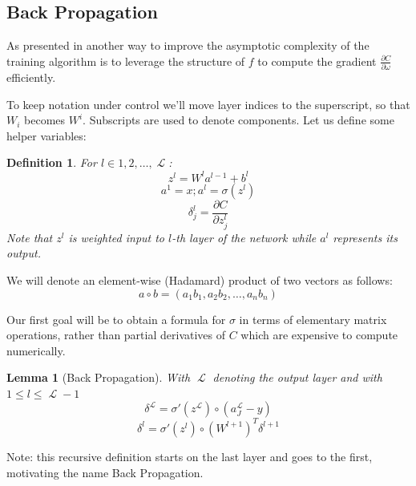 \documentclass[a4paper]{article}
\theoremstyle{break}
\newtheorem{definition}{Definition}[section]
\newtheorem{lemma}[theorem]{Lemma}
\newcommand{\Part}[2]{\frac{\partial #1}{\partial #2}}
\DeclareMathOperator{\La}{\mathcal{L}}
\begin{document}
\subsection{Back Propagation}
As presented in \cite[pp11-14]{higham} another way to improve the asymptotic complexity of the training algorithm is to leverage the structure of $f$ to compute the gradient $ \frac{\partial C}{\partial \omega} $ efficiently.

To keep notation under control we'll move layer indices to the superscript, so that $W_i$ becomes $ W^i $. Subscripts are used to denote components. Let us define some helper variables:
\begin{definition}\label{def:back_prop_helper}
For $ l \in {1, 2, \ldots, \La} $:
    $$ z^l = W^l a^{l-1} + b^{l} $$
    $$ a^1 = x; a^l = \sigma( z^l ) $$
    $$ \delta^l_j = \Part{C}{ z_j^l } $$
Note that $z^l$ is weighted input to $l$-th layer of the network while $a^l$ represents its output.
\end{definition}

We will denote an element-wise (Hadamard) product of two vectors as follows:
    \newcommand{\hadam}{\circ}
    $$ a \hadam b = (a_1 b_1, a_2 b_2, \ldots, a_n b_n)$$

Our first goal will be to obtain a formula for $\sigma$ in terms of elementary matrix operations, rather than partial derivatives of $C$ which are expensive to compute numerically.

\begin{lemma}[Back Propagation]\label{lem:back_propagation}
With $\La$ denoting the output layer and with $ 1 \leq l \leq \La - 1$ 
\begin{equation}\label{eq:last_sigma}
   \delta^{\La} = \sigma'(z^{\La}) \hadam (a_J^{\La} - y ) 
\end{equation}
\begin{equation}\label{eq:previous_sigma}
    \delta^l = \sigma'(z^l) \hadam (W^{l+1})^T \delta^{l+1}
\end{equation}
\end{lemma}

Note: this recursive definition starts on the last layer and goes to the first, motivating the name Back Propagation.
\end{document}
